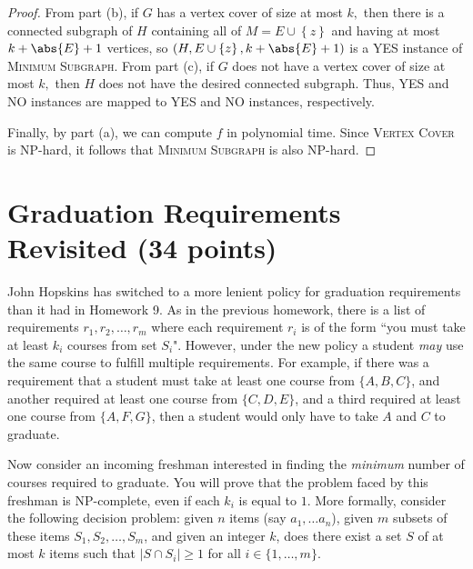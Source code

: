\documentclass{article}
\begin{document}
\begin{enumerate}[(a), resume]
\begin{proof}
			From part (b), if $G$ has a vertex cover of size at most $k,$ then there is a connected subgraph of $H$ containing all of $M=E\cup \left\{ z \right\}$ and having at most $k+\abs{E}+1$ vertices, so $(H, E\cup \left\{ z \right\}, k+\abs{E}+1)$ is a YES instance of \textsc{Minimum Subgraph}. From part (c), if $G$ does not have a vertex cover of size at most $k,$ then $H$ does not have the desired connected subgraph. Thus, YES and NO instances are mapped to YES and NO instances, respectively.

			Finally, by part (a), we can compute $f$ in polynomial time. Since \textsc{Vertex Cover} is NP-hard, it follows that \textsc{Minimum Subgraph} is also NP-hard.
		\end{proof}

\end{enumerate}

\section{Graduation Requirements Revisited (34 points)}

John Hopskins has switched to a more lenient policy for graduation requirements than it had in Homework 9.  As in the previous homework, there is a list of requirements $r_1, r_2, \dots, r_m$ where each requirement $r_i$ is of the form ``you must take at least $k_i$ courses from set $S_i$".  However, under the new policy a student \emph{may} use the same course to fulfill multiple requirements.  For example, if there was a requirement that a student must take at least one course from $\{A,B,C\}$, and another required at least one course from $\{C,D,E\}$, and a third required at least one course from $\{A,F,G\}$, then a student would only have to take $A$ and $C$ to graduate.  

Now consider an incoming freshman interested in finding the \emph{minimum} number of courses required to graduate.  You will prove that the problem faced by this freshman is NP-complete, even if each $k_i$ is equal to $1$.  More formally, consider the following decision problem: given $n$ items (say $a_1, \dots a_n$), given $m$ subsets of these items $S_1, S_2, \dots, S_m$, and given an integer $k$, does there exist a set $S$ of at most $k$ items such that $|S \cap S_i| \geq 1$ for all $i \in \{1, \dots, m\}$.  
\end{document}
